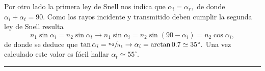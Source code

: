 \documentclass[a4paper,12pt]{exam}
\newcommand{\halmos}{\vspace*{-7mm}
	
					\begin{flushright}
						\rule{1mm}{2.5mm} 
					\end{flushright}\vspace*{-6mm}
						
					  }
\renewcommand{\qed}{\halmos}
\begin{document}
\begin{enumerate}
\begin{mdframed}[backgroundcolor=yellow!20]
		Por otro lado la primera ley de Snell nos indica que $\alpha_i=\alpha_r,$ de donde $\alpha_i+\alpha_t=90.$
		Como los rayos incidente y transmitido deben cumplir la segunda ley de Snell resulta
		$$n_1\sin\alpha_i=n_2\sin\alpha_t\longrightarrow n_1\sin\alpha_i=n_2\sin(90-\alpha_i)=n_2\cos\alpha_i,$$
		de donde se deduce que $\tan\alpha_i=\sfrac{n_2}{n_1}\rightarrow{\alpha_i=\arctan{0.7}\simeq 35^\circ.}$ Una vez calculado este valor es fácil hallar $\alpha_t\simeq 55^\circ.$
		\end{mdframed}
\qed
		
		
		
		
		
		
		
		
		
		
		
		
		
		
		




	
		
\end{enumerate}		
 
\end{document}
